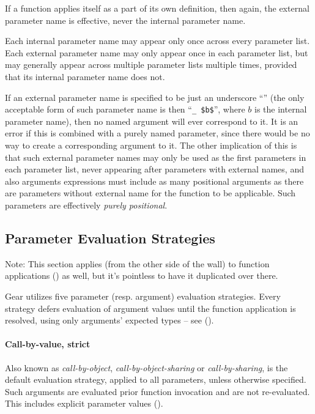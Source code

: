 If a function applies itself as a part of its own definition, then again, the external parameter name is effective, never the internal parameter name. 

Each internal parameter name may appear only once across every parameter list. Each external parameter name may only appear once in each parameter list, but may generally appear across multiple parameter lists multiple times, provided that its internal parameter name does not. 

If an external parameter name is specified to be just an underscore ``\code{_}'' (the only acceptable form of such parameter name is then ``\lstinline!_ $b$!'', where $b$ is the internal parameter name), then no named argument will ever correspond to it. It is an error if this is combined with a purely named parameter, since there would be no way to create a corresponding argument to it. The other implication of this is that such external parameter names may only be used as the first parameters in each parameter list, never appearing after parameters with external names, and also arguments expressions must include as many positional arguments as there are parameters without external name for the function to be applicable. Such parameters are effectively {\em purely positional}. 





\subsection{Parameter Evaluation Strategies}
\label{sec:param-eval-strategies}

Note: This section applies (from the other side of the wall) to function applications () as well, but it's pointless to have it duplicated over there. 

Gear utilizes five parameter (resp. argument) evaluation strategies. Every strategy defers evaluation of argument values until the function application is resolved, using only arguments' expected types -- see (). 

\paragraph{Call-by-value, strict}
Also known as {\em call-by-object}, {\em call-by-object-sharing} or {\em call-by-sharing}, is the default evaluation strategy, applied to all parameters, unless otherwise specified. Such arguments are evaluated prior function invocation and are not re-evaluated. This includes explicit parameter values ().

